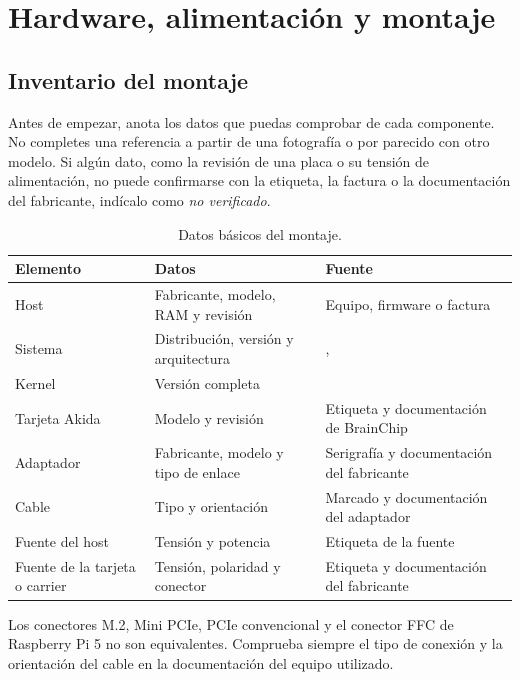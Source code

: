 \chapter{Hardware, alimentación y montaje}
\label{chap:hardware}

\section{Inventario del montaje}

Antes de empezar, anota los datos que puedas comprobar de cada componente.
No completes una referencia a partir de una fotografía o por parecido con otro modelo.
Si algún dato, como la revisión de una placa o su tensión de alimentación, no puede
confirmarse con la etiqueta, la factura o la documentación del fabricante, indícalo como
\emph{no verificado}.

\begin{table}[H]
\centering
\caption{Datos básicos del montaje.}
\label{tab:inventario-lector}
\begin{tabularx}{\textwidth}{@{}L{0.28\textwidth}L{0.31\textwidth}Y@{}}
\toprule
\textbf{Elemento} & \textbf{Datos} & \textbf{Fuente} \\
\midrule
Host & Fabricante, modelo, RAM y revisión & Equipo, firmware o factura \\
Sistema & Distribución, versión y arquitectura & ,  \\
Kernel & Versión completa &  \\
Tarjeta Akida & Modelo y revisión & Etiqueta y documentación de BrainChip \\
Adaptador & Fabricante, modelo y tipo de enlace & Serigrafía y documentación del fabricante \\
Cable & Tipo y orientación & Marcado y documentación del adaptador \\
Fuente del host & Tensión y potencia & Etiqueta de la fuente \\
Fuente de la tarjeta o carrier & Tensión, polaridad y conector & Etiqueta y documentación del fabricante \\
\bottomrule
\end{tabularx}
\end{table}

Los conectores M.2, Mini PCIe, PCIe convencional y el conector FFC de Raspberry Pi 5
no son equivalentes. Comprueba siempre el tipo de conexión y la orientación del cable
en la documentación del equipo utilizado.

